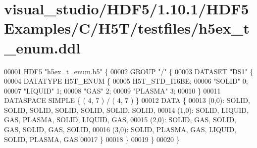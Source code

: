 \hypertarget{visual__studio_2_h_d_f5_21_810_81_2_h_d_f5_examples_2_c_2_h5_t_2testfiles_2h5ex__t__enum_8ddl_source}{}\section{visual\+\_\+studio/\+H\+D\+F5/1.10.1/\+H\+D\+F5\+Examples/\+C/\+H5\+T/testfiles/h5ex\+\_\+t\+\_\+enum.ddl}
\label{visual__studio_2_h_d_f5_21_810_81_2_h_d_f5_examples_2_c_2_h5_t_2testfiles_2h5ex__t__enum_8ddl_source}

\begin{DoxyCode}
00001 \hyperlink{namespace_h_d_f5}{HDF5} \textcolor{stringliteral}{"h5ex\_t\_enum.h5"} \{
00002 GROUP \textcolor{stringliteral}{"/"} \{
00003    DATASET \textcolor{stringliteral}{"DS1"} \{
00004       DATATYPE  H5T\_ENUM \{
00005          H5T\_STD\_I16BE;
00006          \textcolor{stringliteral}{"SOLID"}            0;
00007          \textcolor{stringliteral}{"LIQUID"}           1;
00008          \textcolor{stringliteral}{"GAS"}              2;
00009          \textcolor{stringliteral}{"PLASMA"}           3;
00010       \}
00011       DATASPACE  SIMPLE \{ ( 4, 7 ) / ( 4, 7 ) \}
00012       DATA \{
00013       (0,0): SOLID, SOLID, SOLID, SOLID, SOLID, SOLID, SOLID,
00014       (1,0): SOLID, LIQUID, GAS, PLASMA, SOLID, LIQUID, GAS,
00015       (2,0): SOLID, GAS, SOLID, GAS, SOLID, GAS, SOLID,
00016       (3,0): SOLID, PLASMA, GAS, LIQUID, SOLID, PLASMA, GAS
00017       \}
00018    \}
00019 \}
00020 \}
\end{DoxyCode}
